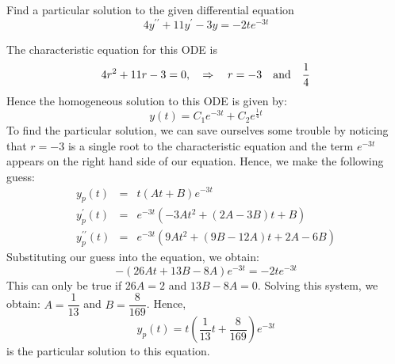\documentclass[11pt]{article}
\begin{document}
\begin{problem}
Find a particular solution to the given differential equation
\begin{equation*}
4y^{\prime \prime}+11y^{\prime} -  3y = -2te^{-3t}
\end{equation*}
\end{problem}
\begin{solution}
The characteristic equation for this ODE is 
\begin{equation}
4r^2 +11r -3 =0, \quad  \Rightarrow \quad r= -3 \quad {\rm and} \quad \frac{1}{4}
\end{equation}
Hence the homogeneous solution to this ODE is given by:
\begin{equation}
y(t) = C_{1} e^{-3 t}  + C_{2} e^{\frac{1}{4}t}
\end{equation}
To find the particular solution, we can save ourselves some trouble by noticing that $r =-3$ is a single root to the characteristic equation and the term $e^{-3t}$ appears on the right hand side of our equation.
Hence, we make the following guess:
\begin{eqnarray*}
y_{p}(t) & = & t(At+B)e^{-3t} \\
y_{p}^{\prime}(t) &= & e^{-3t}(-3At^2+(2A-3B)t+B) \\
y_{p}^{\prime \prime}(t) &= & e^{-3t}(9At^2+(9B-12A)t+2A-6B)
\end{eqnarray*}
Substituting our guess into the equation, we obtain:
\begin{equation*}
-(26At+13B-8A)e^{-3t} = -2te^{-3t}
\end{equation*}
This can only be true if $26A = 2$ and $13B-8A=0$. Solving this system, we obtain: $A=\dfrac{1}{13}$ and $B=\dfrac{8}{169}$.
Hence, $$\boxed{y_{p}(t) = t\left(\dfrac{1}{13}t+\dfrac{8}{169}\right)e^{-3t}}$$ is the particular solution to this equation.
\end{solution}
\end{document}
